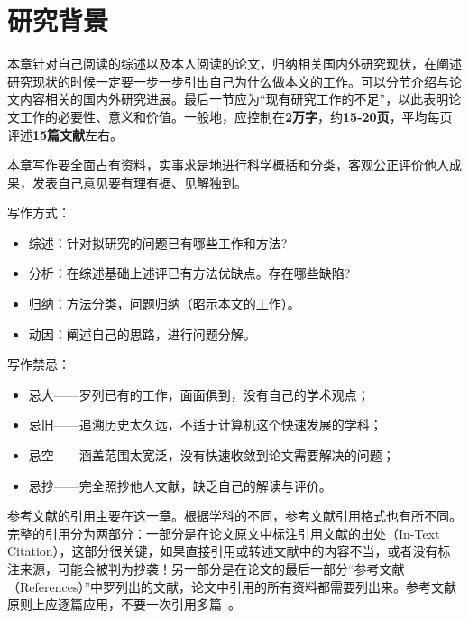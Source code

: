 \chapter{研究背景}

本章针对自己阅读的综述以及本人阅读的论文，归纳相关国内外研究现状，在阐述研究现状的时候一定要一步一步引出自己为什么做本文的工作。可以分节介绍与论文内容相关的国内外研究进展。最后一节应为“现有研究工作的不足”，以此表明论文工作的必要性、意义和价值。一般地，应控制在\textbf{2万字}，约\textbf{15-20页}，平均每页评述\textbf{15篇文献}左右。

本章写作要全面占有资料，实事求是地进行科学概括和分类，客观公正评价他人成果，发表自己意见要有理有据、见解独到。

写作方式：
\begin{itemize}
    \item 综述：针对拟研究的问题已有哪些工作和方法?
    \item 分析：在综述基础上述评已有方法优缺点。存在哪些缺陷?
    \item 归纳：方法分类，问题归纳（昭示本文的工作）。
    \item 动因：阐述自己的思路，进行问题分解。
\end{itemize}

写作禁忌：
\begin{itemize}
    \item 忌大——罗列已有的工作，面面俱到，没有自己的学术观点；
    \item 忌旧——追溯历史太久远，不适于计算机这个快速发展的学科；
    \item 忌空——涵盖范围太宽泛，没有快速收敛到论文需要解决的问题；
    \item 忌抄——完全照抄他人文献，缺乏自己的解读与评价。
\end{itemize}

参考文献的引用主要在这一章。根据学科的不同，参考文献引用格式也有所不同。完整的引用分为两部分：一部分是在论文原文中标注引用文献的出处（In-Text Citation），这部分很关键，如果直接引用或转述文献中的内容不当，或者没有标注来源，可能会被判为抄袭！另一部分是在论文的最后一部分“参考文献（References）”中罗列出的文献，论文中引用的所有资料都需要列出来。参考文献原则上应逐篇应用，不要一次引用多篇~\cite{geiger2012we,fang2023eva,abadi2016tensorflow,shokri2015privacy}。
